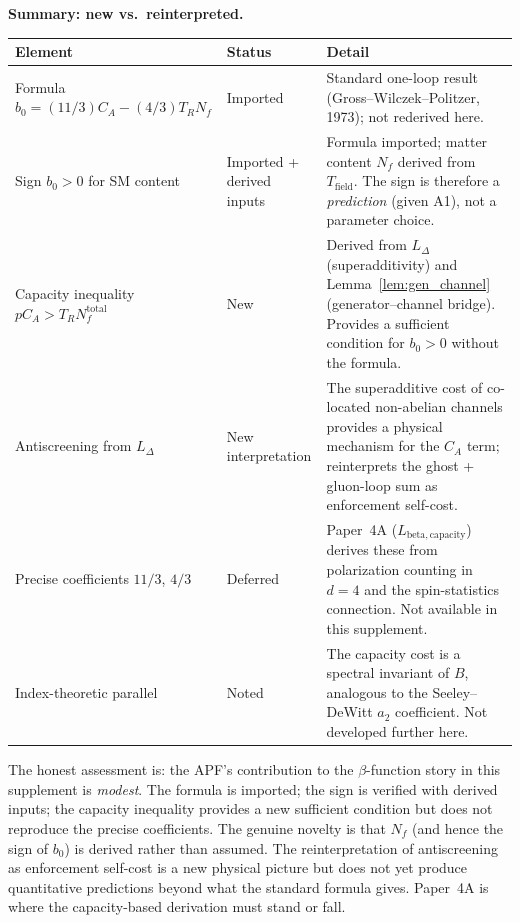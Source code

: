 \documentclass[11pt,a4paper]{article}
\theoremstyle{definition}
\begin{document}
\smallskip\noindent\textbf{Summary: new vs.\ reinterpreted.}\quad

\begin{center}\small
\renewcommand{\arraystretch}{1.2}
\begin{tabular}{@{}p{4.5cm}p{1.8cm}p{6.5cm}@{}}
\toprule
\textbf{Element} & \textbf{Status} & \textbf{Detail} \\
\midrule
Formula $b_0 = (11/3)C_A - (4/3)T_R N_f$ &
  Imported &
  Standard one-loop result (Gross--Wilczek--Politzer, 1973);
  not rederived here. \\[3pt]
Sign $b_0 > 0$ for SM content &
  Imported + derived inputs &
  Formula imported; matter content $N_f$ derived from
  $T_{\mathrm{field}}$.  The sign is therefore a \emph{prediction}
  (given A1), not a parameter choice. \\[3pt]
Capacity inequality $p C_A > T_R N_f^{\mathrm{total}}$ &
  New &
  Derived from $L_\Delta$ (superadditivity) and
  Lemma~\ref{lem:gen_channel} (generator--channel bridge).
  Provides a sufficient condition for $b_0 > 0$ without the
  formula. \\[3pt]
Antiscreening from $L_\Delta$ &
  New interpretation &
  The superadditive cost of co-located non-abelian channels
  provides a physical mechanism for the $C_A$ term;
  reinterprets the ghost + gluon-loop sum as enforcement
  self-cost. \\[3pt]
Precise coefficients $11/3$, $4/3$ &
  Deferred &
  Paper~4A ($L_{\mathrm{beta,capacity}}$) derives these from
  polarization counting in $d = 4$ and the spin-statistics
  connection.  Not available in this supplement. \\[3pt]
Index-theoretic parallel &
  Noted &
  The capacity cost is a spectral invariant of $B$, analogous
  to the Seeley--DeWitt $a_2$ coefficient.  Not developed
  further here. \\
\bottomrule
\end{tabular}
\end{center}

\smallskip\noindent The honest assessment is: the APF's
contribution to the $\beta$-function story in this supplement is
\emph{modest}.  The formula is imported; the sign is verified with
derived inputs; the capacity inequality provides a new sufficient
condition but does not reproduce the precise coefficients.  The
genuine novelty is that $N_f$ (and hence the sign of $b_0$) is
derived rather than assumed.  The reinterpretation of antiscreening
as enforcement self-cost is a new physical picture but does not yet
produce quantitative predictions beyond what the standard formula
gives.  Paper~4A is where the capacity-based derivation must stand
or fall.
\end{document}

